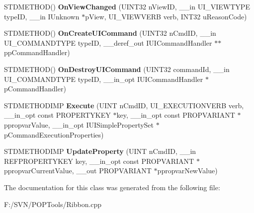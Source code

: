 \begin{DoxyCompactItemize}
\item 
\hypertarget{class_c_application_a0a72c98b2cd788fec19349908c40d483}{S\-T\-D\-M\-E\-T\-H\-O\-D() {\bfseries On\-View\-Changed} (U\-I\-N\-T32 n\-View\-I\-D, \-\_\-\-\_\-in U\-I\-\_\-\-V\-I\-E\-W\-T\-Y\-P\-E type\-I\-D, \-\_\-\-\_\-in I\-Unknown $\ast$p\-View, U\-I\-\_\-\-V\-I\-E\-W\-V\-E\-R\-B verb, I\-N\-T32 u\-Reason\-Code)}\label{class_c_application_a0a72c98b2cd788fec19349908c40d483}

\item 
\hypertarget{class_c_application_ae2a5531439ab4e84c8ef77bfc1dd04e7}{S\-T\-D\-M\-E\-T\-H\-O\-D() {\bfseries On\-Create\-U\-I\-Command} (U\-I\-N\-T32 n\-Cmd\-I\-D, \-\_\-\-\_\-in U\-I\-\_\-\-C\-O\-M\-M\-A\-N\-D\-T\-Y\-P\-E type\-I\-D, \-\_\-\-\_\-deref\-\_\-out I\-U\-I\-Command\-Handler $\ast$$\ast$pp\-Command\-Handler)}\label{class_c_application_ae2a5531439ab4e84c8ef77bfc1dd04e7}

\item 
\hypertarget{class_c_application_a19a9c7447fa3c547166d5d1d8c9308ac}{S\-T\-D\-M\-E\-T\-H\-O\-D() {\bfseries On\-Destroy\-U\-I\-Command} (U\-I\-N\-T32 command\-Id, \-\_\-\-\_\-in U\-I\-\_\-\-C\-O\-M\-M\-A\-N\-D\-T\-Y\-P\-E type\-I\-D, \-\_\-\-\_\-in\-\_\-opt I\-U\-I\-Command\-Handler $\ast$p\-Command\-Handler)}\label{class_c_application_a19a9c7447fa3c547166d5d1d8c9308ac}

\item 
\hypertarget{class_c_application_a5f5e7397c0c70f7fb24e25a2013d031f}{S\-T\-D\-M\-E\-T\-H\-O\-D\-I\-M\-P {\bfseries Execute} (U\-I\-N\-T n\-Cmd\-I\-D, U\-I\-\_\-\-E\-X\-E\-C\-U\-T\-I\-O\-N\-V\-E\-R\-B verb, \-\_\-\-\_\-in\-\_\-opt const P\-R\-O\-P\-E\-R\-T\-Y\-K\-E\-Y $\ast$key, \-\_\-\-\_\-in\-\_\-opt const P\-R\-O\-P\-V\-A\-R\-I\-A\-N\-T $\ast$ppropvar\-Value, \-\_\-\-\_\-in\-\_\-opt I\-U\-I\-Simple\-Property\-Set $\ast$p\-Command\-Execution\-Properties)}\label{class_c_application_a5f5e7397c0c70f7fb24e25a2013d031f}

\item 
\hypertarget{class_c_application_a6d5911a93c8f39c3e0316ba43dc6dc8f}{S\-T\-D\-M\-E\-T\-H\-O\-D\-I\-M\-P {\bfseries Update\-Property} (U\-I\-N\-T n\-Cmd\-I\-D, \-\_\-\-\_\-in R\-E\-F\-P\-R\-O\-P\-E\-R\-T\-Y\-K\-E\-Y key, \-\_\-\-\_\-in\-\_\-opt const P\-R\-O\-P\-V\-A\-R\-I\-A\-N\-T $\ast$ppropvar\-Current\-Value, \-\_\-\-\_\-out P\-R\-O\-P\-V\-A\-R\-I\-A\-N\-T $\ast$ppropvar\-New\-Value)}\label{class_c_application_a6d5911a93c8f39c3e0316ba43dc6dc8f}

\end{DoxyCompactItemize}


The documentation for this class was generated from the following file\-:\begin{DoxyCompactItemize}
\item 
F\-:/\-S\-V\-N/\-P\-O\-P\-Tools/Ribbon.\-cpp\end{DoxyCompactItemize}
